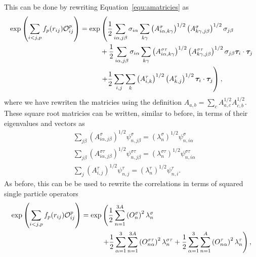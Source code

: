 This can be done by rewriting Equation~\ref{equ:amatricies} as
\begin{equation}
\begin{split}
   \exp\left(\sum\limits_{i<j,p}f_p(r_{ij})\mathcal{O}^p_{ij}\right) = \exp&\left(\frac{1}{2}\sum\limits_{i\alpha,j\beta} \sigma_{i\alpha}\sum\limits_{k\gamma}\left(A^{\sigma}_{i\alpha,k\gamma}\right)^{1/2}\left(A^{\sigma}_{k\gamma,j\beta}\right)^{1/2}\sigma_{j\beta}\right. \\
      & + \frac{1}{2}\sum\limits_{i\alpha,j\beta} \sigma_{i\alpha}\sum\limits_{k\gamma}\left(A^{\sigma\tau}_{i\alpha,k\gamma}\right)^{1/2}\left(A^{\sigma\tau}_{k\gamma,j\beta}\right)^{1/2}\sigma_{j\beta}\bm{\tau}_i\cdot\bm{\tau}_j \\
      &\left. + \frac{1}{2}\sum\limits_{i,j} \sum\limits_{k}\left(A^{\tau}_{i,k}\right)^{1/2}\left(A^{\tau}_{k,j}\right)^{1/2}\bm{\tau}_i\cdot\bm{\tau}_j\right),
   \label{equ:amatricies}
\end{split}
\end{equation}
where we have rewriten the matricies using the definition $A_{a,b} = \sum_cA^{1/2}_{a,c}A^{1/2}_{c,b}$. These square root matricies can be written, similar to before, in terms of their eigenvalues and vectors as
\begin{align}
   &\sum\limits_{j\beta} \left(A^{\sigma}_{i\alpha,j\beta}\right)^{1/2}\psi^{\sigma}_{n,j\beta} = \left(\lambda^{\sigma}_n\right)^{1/2}\psi^{\sigma}_{n,i\alpha} \\
   &\sum\limits_{j\beta} \left(A^{\sigma\tau}_{i\alpha,j\beta}\right)^{1/2}\psi^{\sigma\tau}_{n,j\beta} = \left(\lambda^{\sigma\tau}_n\right)^{1/2}\psi^{\sigma\tau}_{n,i\alpha} \\
   &\sum\limits_{j} \left(A^{\tau}_{i,j}\right)^{1/2}\psi^{\tau}_{n,j} = \left(\lambda^{\tau}_n\right)^{1/2}\psi^{\tau}_{n,i}.
\end{align}
As before, this can be be used to rewrite the correlations in terms of squared single particle operators
\begin{equation}
\begin{split}
   \exp\left(\sum\limits_{i<j,p}f_p(r_{ij})\mathcal{O}^p_{ij}\right) = \exp&\left(\frac{1}{2}\sum\limits_{n=1}^{3A} \left(O_{n}^{\sigma}\right)^2 \lambda_n^{\sigma}\right. \\
      & \left. + \frac{1}{2}\sum\limits_{\alpha=1}^{3}\sum\limits_{n=1}^{3A} \left(O_{n\alpha}^{\sigma\tau}\right)^2 \lambda_n^{\sigma\tau}
      + \frac{1}{2}\sum\limits_{\alpha=1}^{3}\sum\limits_{n=1}^{A} \left(O_{n\alpha}^{\tau}\right)^2 \lambda_n^{\tau}\right),
\end{split}
\end{equation}

